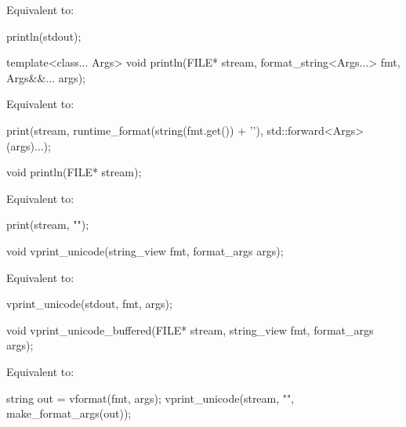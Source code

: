 \begin{itemdescr}
\pnum
\effects
Equivalent to:
\begin{codeblock}
println(stdout);
\end{codeblock}
\end{itemdescr}

%
\begin{itemdecl}
template<class... Args>
  void println(FILE* stream, format_string<Args...> fmt, Args&&... args);
\end{itemdecl}

\begin{itemdescr}
\pnum
\effects
Equivalent to:
\begin{codeblock}
print(stream, runtime_format(string(fmt.get()) + '\n'), std::forward<Args>(args)...);
\end{codeblock}
\end{itemdescr}

%
\begin{itemdecl}
void println(FILE* stream);
\end{itemdecl}

\begin{itemdescr}
\pnum
\effects
Equivalent to:
\begin{codeblock}
print(stream, "\n");
\end{codeblock}
\end{itemdescr}

%
\begin{itemdecl}
void vprint_unicode(string_view fmt, format_args args);
\end{itemdecl}

\begin{itemdescr}
\pnum
\effects
Equivalent to:
\begin{codeblock}
vprint_unicode(stdout, fmt, args);
\end{codeblock}
\end{itemdescr}

%
\begin{itemdecl}
void vprint_unicode_buffered(FILE* stream, string_view fmt, format_args args);
\end{itemdecl}

\begin{itemdescr}
\pnum
\effects
Equivalent to:
\begin{codeblock}
string out = vformat(fmt, args);
vprint_unicode(stream, "{}", make_format_args(out));
\end{codeblock}
\end{itemdescr}

